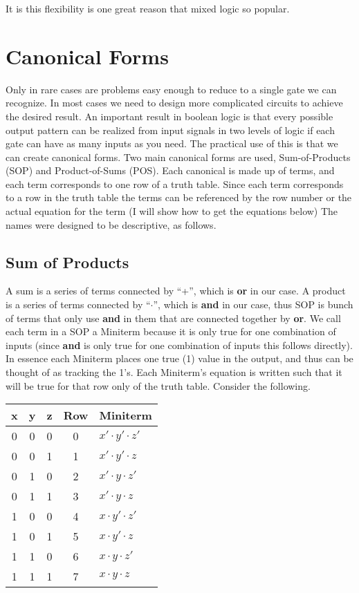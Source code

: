 It is this flexibility is one great reason that mixed logic so popular.


\section{Canonical Forms}\label{s-canonical}

Only in rare cases are problems easy enough to reduce to a single gate we can recognize.  In most cases we need to design more complicated circuits to achieve the desired result.  An important result in boolean logic is that every possible output pattern can be realized from input signals in two levels of logic if each gate can have as many inputs as you need.  The practical use of this is that we can create canonical forms.  Two main canonical forms are used, Sum-of-Products (SOP) and Product-of-Sums (POS).  Each canonical is made up of terms, and each term corresponds to one row of a truth table.  Since each term corresponds to a row in the truth table the terms can be referenced by the row number or the actual equation for the term (I will show how to get the equations below)  The names were designed to be descriptive, as follows.

\subsection{Sum of Products}

A sum is a series of terms connected by ``+'', which is \textbf{or} in our case.  A product is a series of terms connected by ``$\cdot$'', which is \textbf{and} in our case, thus SOP is bunch of terms that only use \textbf{and} in them that are connected together by \textbf{or}.  We call each term in a SOP a Miniterm because it is only true for one combination of inputs (since \textbf{and} is only true for one combination of inputs this follows directly).  In essence each Miniterm places one true (1) value in the output, and thus can be thought of as tracking the 1's.  Each Miniterm's equation is written such that it will be true for that row only of the truth table.  Consider the following.

\vspace{.1in}
\begin{tabular}{c|c|c|cl}
x & y & z & Row & Miniterm   \\ \hline
0 & 0 & 0 & 0   & $x'\cdot y'\cdot z'$ \\
0 & 0 & 1 & 1   & $x'\cdot y'\cdot z$  \\
0 & 1 & 0 & 2   & $x'\cdot y\cdot z'$  \\
0 & 1 & 1 & 3   & $x'\cdot y\cdot z$   \\
1 & 0 & 0 & 4   & $x\cdot y'\cdot z'$  \\
1 & 0 & 1 & 5   & $x\cdot y'\cdot z$   \\
1 & 1 & 0 & 6   & $x\cdot y\cdot z'$   \\
1 & 1 & 1 & 7   & $x\cdot y\cdot z$    \\
\end{tabular}
\vspace{.1in}

